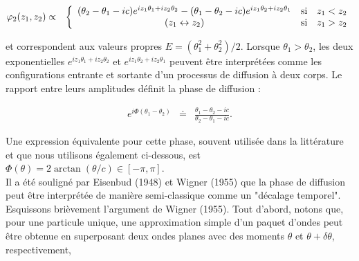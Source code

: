 \begin{eqnarray}\label{eq:I-1-10}
	\varphi_2(z_1 , z_2) & \propto &  \left \{ \begin{array} { c cl} ( \theta_2 - \theta_1 - ic) e^{ i z_1 \theta_1 + iz_2 \theta_2 } - ( \theta_1 - \theta_2 - ic) e^{ i z_1 \theta_2 + iz_2 \theta_1} & \mbox{si} & z_1 < z_2 \\ (z_1 \leftrightarrow z_2) & \mbox{si} & z_1 > z_2 \end{array} \right.
\end{eqnarray}


et correspondent aux valeurs propres $E = (\theta_1^2 + \theta_2^2)/2$. Lorsque $\theta_1 > \theta_2$, les deux exponentielles $e^{i z_1 \theta_1 + i z_2 \theta_2}$ et $e^{i z_1 \theta_2 + i z_2 \theta_1}$ peuvent être interprétées comme les configurations entrante et sortante d’un processus de diffusion à deux corps. Le rapport entre leurs amplitudes définit la phase de diffusion :

\begin{eqnarray}\label{eq:I-1-11}
	e^{i\Phi ( \theta_1 - \theta_2 ) } & \doteq & \frac{\theta_1 - \theta_2 - ic} { \theta_2 - \theta_1 - ic}. 
\end{eqnarray}

Une expression équivalente pour cette phase, souvent utilisée dans la littérature et que nous utilisons également ci-dessous, est $\Phi ( \theta ) = 2 \arctan ( \theta/c) \in [ - \pi , \pi ] $.\\

Il a été souligné par {\color{blue}Eisenbud (1948)} et {\color{blue}Wigner (1955)} que la phase de diffusion peut être interprétée de manière semi-classique comme un "décalage temporel". Esquissons brièvement l'argument de {\color{blue}Wigner (1955)}. Tout d'abord, notons que, pour une particule unique, une approximation simple d'un paquet d'ondes peut être obtenue en superposant deux ondes planes avec des moments $\theta$ et $\theta + \delta \theta $, respectivement,

